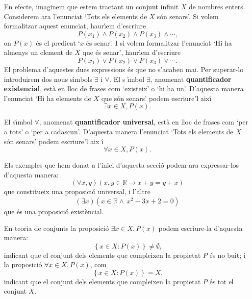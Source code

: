 En efecte, imaginem que estem tractant un conjunt infinit $X$ de nombres
enters. Considerem ara l'enunciat `Tots els elements de $X$ s\'{o}n senars'.
Si volem formalitzar aquest enunciat, haur\'{\i}em d'escriure%
\begin{equation*}
P(x_{1})\wedge P(x_{2})\wedge P(x_{3})\wedge\cdots\text{,}
\end{equation*}
on $P(x)$ \'{e}s el predicat `$x$ \'{e}s senar'. I si volem formalitzar
l'enunciat `Hi ha almenys un element de $X$ que \'{e}s senar', haur\'{\i}em
d'escriure%
\begin{equation*}
P(x_{1})\vee P(x_{2})\vee P(x_{3})\vee\cdots\text{.}
\end{equation*}
El problema d'aquestes dues expressions \'{e}s que no s'acaben mai. Per
superar-lo introduirem dos nous s\'{\i}mbols $\exists$ i $\forall$. El s%
\'{\i}mbol $\exists$, anomenat \textbf{quantificador existencial}, est\`{a}
en lloc de frases com `existeix' o `hi ha un'. D'aquesta manera l'enunciat
`Hi ha elements de $X$ que s\'{o}n senars' podem escriure'l aix\'{\i}%
\begin{equation*}
\exists x\in X,P(x)\text{.}
\end{equation*}

El s\'{\i}mbol $\forall$, anomenat \textbf{quantificador universal}, est\`{a}
en lloc de frases com `per a tots' o `per a cadascun'. D'aquesta manera
l'enunciat `Tots els elements de $X$ s\'{o}n senars' podem escriure'l aix%
\'{\i}%
\begin{equation*}
\forall x\in X,P(x)\text{.}
\end{equation*}

\bigskip

Els exemples que hem donat a l'inici d'aquesta secci\'{o} podem ara
expressar-los d'aquesta manera:
\begin{equation*}
\left( \forall x,y\right) \left( x,y\in\mathbb{R}\longrightarrow
x+y=y+x\right)
\end{equation*}
que constitueix una proposici\'{o} universal, i l'altre%
\begin{equation*}
\left( \exists x\right) \left( x\in\mathbb{R\wedge~}x^{2}-3x+2=0\right)
\end{equation*}
que \'{e}s una proposici\'{o} exist\`{e}ncial.

\begin{observacio}
En teoria de conjunts la proposici\'{o} $\exists x\in X,P(x)$ podem
escriure-la d'aquesta manera:%
\begin{equation*}
\left\{ x\in X:P(x)\right\} \neq\emptyset\text{,}
\end{equation*}
indicant que el conjunt dels elements que compleixen la propietat $P$ \'{e}s
no buit; i la proposici\'{o} $\forall x\in X,P(x)$, com%
\begin{equation*}
\left\{ x\in X:P(x)\right\} =X\text{,}
\end{equation*}
indicant que el conjunt dels elements que compleixen la propietat $P$ \'{e}s
tot el conjunt $X$.
\end{observacio}

